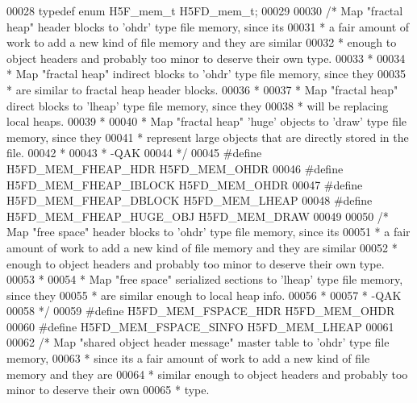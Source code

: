 \begin{DoxyCode}
00028 \textcolor{keyword}{typedef} \textcolor{keyword}{enum} H5F\_mem\_t  H5FD\_mem\_t;
00029 
00030 \textcolor{comment}{/* Map "fractal heap" header blocks to 'ohdr' type file memory, since its}
00031 \textcolor{comment}{ * a fair amount of work to add a new kind of file memory and they are similar}
00032 \textcolor{comment}{ * enough to object headers and probably too minor to deserve their own type.}
00033 \textcolor{comment}{ *}
00034 \textcolor{comment}{ * Map "fractal heap" indirect blocks to 'ohdr' type file memory, since they}
00035 \textcolor{comment}{ * are similar to fractal heap header blocks.}
00036 \textcolor{comment}{ *}
00037 \textcolor{comment}{ * Map "fractal heap" direct blocks to 'lheap' type file memory, since they}
00038 \textcolor{comment}{ * will be replacing local heaps.}
00039 \textcolor{comment}{ *}
00040 \textcolor{comment}{ * Map "fractal heap" 'huge' objects to 'draw' type file memory, since they}
00041 \textcolor{comment}{ * represent large objects that are directly stored in the file.}
00042 \textcolor{comment}{ *}
00043 \textcolor{comment}{ *      -QAK}
00044 \textcolor{comment}{ */}
00045 \textcolor{preprocessor}{#define H5FD\_MEM\_FHEAP\_HDR      H5FD\_MEM\_OHDR}
00046 \textcolor{preprocessor}{#define H5FD\_MEM\_FHEAP\_IBLOCK   H5FD\_MEM\_OHDR}
00047 \textcolor{preprocessor}{#define H5FD\_MEM\_FHEAP\_DBLOCK   H5FD\_MEM\_LHEAP}
00048 \textcolor{preprocessor}{#define H5FD\_MEM\_FHEAP\_HUGE\_OBJ H5FD\_MEM\_DRAW}
00049 
00050 \textcolor{comment}{/* Map "free space" header blocks to 'ohdr' type file memory, since its}
00051 \textcolor{comment}{ * a fair amount of work to add a new kind of file memory and they are similar}
00052 \textcolor{comment}{ * enough to object headers and probably too minor to deserve their own type.}
00053 \textcolor{comment}{ *}
00054 \textcolor{comment}{ * Map "free space" serialized sections to 'lheap' type file memory, since they}
00055 \textcolor{comment}{ * are similar enough to local heap info.}
00056 \textcolor{comment}{ *}
00057 \textcolor{comment}{ *      -QAK}
00058 \textcolor{comment}{ */}
00059 \textcolor{preprocessor}{#define H5FD\_MEM\_FSPACE\_HDR     H5FD\_MEM\_OHDR}
00060 \textcolor{preprocessor}{#define H5FD\_MEM\_FSPACE\_SINFO   H5FD\_MEM\_LHEAP}
00061 
00062 \textcolor{comment}{/* Map "shared object header message" master table to 'ohdr' type file memory,}
00063 \textcolor{comment}{ * since its a fair amount of work to add a new kind of file memory and they are}
00064 \textcolor{comment}{ * similar enough to object headers and probably too minor to deserve their own}
00065 \textcolor{comment}{ * type.}

\end{DoxyCode}
